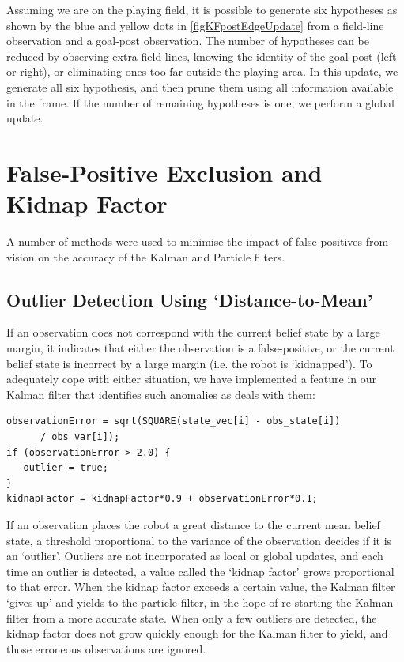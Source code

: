 \documentclass[pdftex,11pt,a4paper]{report}
\begin{document}
Assuming we are on the playing field, it is possible to generate six hypotheses as shown by the blue and yellow dots in \autoref{figKFpostEdgeUpdate} from a field-line observation and a goal-post observation. The number of hypotheses can be reduced by observing extra field-lines, knowing the identity of the goal-post (left or right), or eliminating ones too far outside the playing area. In this update, we generate all six hypothesis, and then prune them using all information available in the frame. If the number of remaining hypotheses is one, we perform a global update.

\section{False-Positive Exclusion and Kidnap Factor}

A number of methods were used to minimise the impact of false-positives from vision on the accuracy of the Kalman and Particle filters.

\subsection{Outlier Detection Using `Distance-to-Mean'}

If an observation does not correspond with the current belief state by a large margin, it indicates that either the observation is a false-positive, or the current belief state is incorrect by a large margin (i.e. the robot is `kidnapped'). To adequately cope with either situation, we have implemented a feature in our Kalman filter that identifies such anomalies as deals with them:

\begin{lstlisting}
observationError = sqrt(SQUARE(state_vec[i] - obs_state[i])
      / obs_var[i]);
if (observationError > 2.0) {
   outlier = true;
}
kidnapFactor = kidnapFactor*0.9 + observationError*0.1;
\end{lstlisting}

If an observation places the robot a great distance to the current mean belief state, a threshold proportional to the variance of the observation decides if it is an `outlier'. Outliers are not incorporated as local or global updates, and each time an outlier is detected, a value called the `kidnap factor' grows proportional to that error. When the kidnap factor exceeds a certain value, the Kalman filter `gives up' and yields to the particle filter, in the hope of re-starting the Kalman filter from a more accurate state. When only a few outliers are detected, the kidnap factor does not grow quickly enough for the Kalman filter to yield, and those erroneous observations are ignored.
\end{document}
